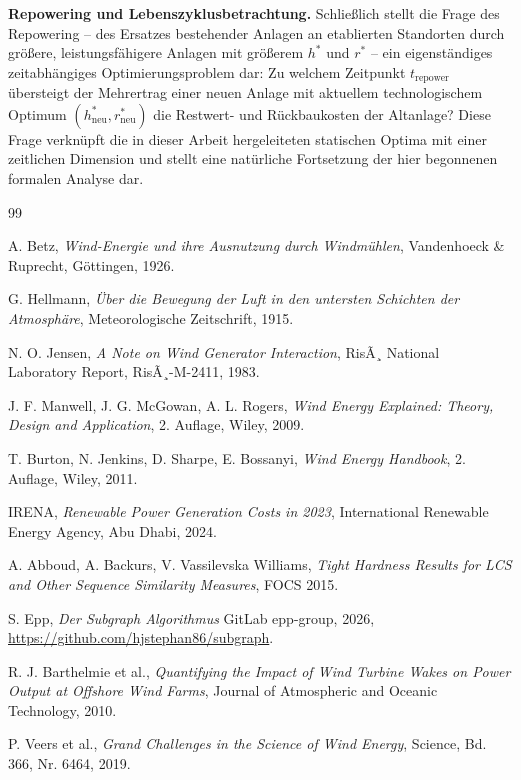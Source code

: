 ﻿\documentclass[a4paper,12pt]{article}
\theoremstyle{definition}
\begin{document}
\textbf{Repowering und Lebenszyklusbetrachtung.} Schließlich stellt die Frage des Repowering -- des Ersatzes bestehender Anlagen an etablierten Standorten durch größere, leistungsfähigere Anlagen mit größerem $h^*$ und $r^*$ -- ein eigenständiges zeitabhängiges Optimierungsproblem dar: Zu welchem Zeitpunkt $t_{\mathrm{repower}}$ übersteigt der Mehrertrag einer neuen Anlage mit aktuellem technologischem Optimum $(h^*_{\mathrm{neu}}, r^*_{\mathrm{neu}})$ die Restwert- und Rückbaukosten der Altanlage? Diese Frage verknüpft die in dieser Arbeit hergeleiteten statischen Optima mit einer zeitlichen Dimension und stellt eine natürliche Fortsetzung der hier begonnenen formalen Analyse dar.

\begin{thebibliography}{99}

A. Betz, \emph{Wind-Energie und ihre Ausnutzung durch Windmühlen}, Vandenhoeck \& Ruprecht, Göttingen, 1926.

G. Hellmann, \emph{Über die Bewegung der Luft in den untersten Schichten der Atmosphäre}, Meteorologische Zeitschrift, 1915.

N. O. Jensen, \emph{A Note on Wind Generator Interaction}, RisÃ¸ National Laboratory Report, RisÃ¸-M-2411, 1983.

J. F. Manwell, J. G. McGowan, A. L. Rogers, \emph{Wind Energy Explained: Theory, Design and Application}, 2. Auflage, Wiley, 2009.

T. Burton, N. Jenkins, D. Sharpe, E. Bossanyi, \emph{Wind Energy Handbook}, 2. Auflage, Wiley, 2011.

IRENA, \emph{Renewable Power Generation Costs in 2023}, International Renewable Energy Agency, Abu Dhabi, 2024.

A. Abboud, A. Backurs, V. Vassilevska Williams, \emph{Tight Hardness Results for LCS and Other Sequence Similarity Measures}, FOCS 2015.

S. Epp, \emph{Der Subgraph Algorithmus} GitLab epp-group, 2026, \url{https://github.com/hjstephan86/subgraph}.

R. J. Barthelmie et al., \emph{Quantifying the Impact of Wind Turbine Wakes on Power Output at Offshore Wind Farms}, Journal of Atmospheric and Oceanic Technology, 2010.

P. Veers et al., \emph{Grand Challenges in the Science of Wind Energy}, Science, Bd. 366, Nr. 6464, 2019.

\end{thebibliography}
\end{document}
